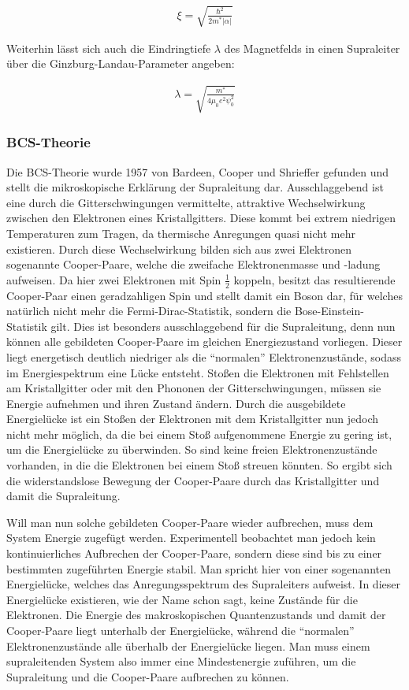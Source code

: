 \begin{align}
\xi= \sqrt{\frac{\hslash^2}{2m^*\vert\alpha\vert}}
\end{align}

Weiterhin lässt sich auch die Eindringtiefe $\lambda$ des Magnetfelds in einen Supraleiter über die Ginzburg-Landau-Parameter angeben:

\begin{align}
\lambda=\sqrt{\frac{m^*}{4\mu_0e^2\psi_0^2}}
\end{align}


\subsubsection{BCS-Theorie}

Die BCS-Theorie wurde 1957 von Bardeen, Cooper und Shrieffer gefunden und stellt die mikroskopische Erklärung der Supraleitung dar. Ausschlaggebend ist eine durch die Gitterschwingungen vermittelte, attraktive Wechselwirkung zwischen den Elektronen eines Kristallgitters. Diese kommt bei extrem niedrigen Temperaturen zum Tragen, da thermische Anregungen quasi nicht mehr existieren. Durch diese Wechselwirkung bilden sich aus zwei Elektronen sogenannte Cooper-Paare, welche die zweifache Elektronenmasse und -ladung aufweisen. Da hier zwei Elektronen mit Spin $\frac{1}{2}$ koppeln, besitzt das resultierende Cooper-Paar einen geradzahligen Spin und stellt damit ein Boson dar, für welches natürlich nicht mehr die Fermi-Dirac-Statistik, sondern die Bose-Einstein-Statistik gilt. Dies ist besonders ausschlaggebend für die Supraleitung, denn nun können alle gebildeten Cooper-Paare im gleichen Energiezustand vorliegen. Dieser liegt energetisch deutlich niedriger als die ``normalen'' Elektronenzustände, sodass im Energiespektrum eine Lücke entsteht. Stoßen die Elektronen mit Fehlstellen am Kristallgitter oder mit den Phononen der Gitterschwingungen, müssen sie Energie aufnehmen und ihren Zustand ändern. Durch die ausgebildete Energielücke ist ein Stoßen der Elektronen mit dem Kristallgitter nun jedoch nicht mehr möglich, da die bei einem Stoß aufgenommene Energie zu gering ist, um die Energielücke zu überwinden. So sind keine freien Elektronenzustände vorhanden, in die die Elektronen bei einem Stoß streuen könnten. So ergibt sich die widerstandslose Bewegung der Cooper-Paare durch das Kristallgitter und damit die Supraleitung. 

Will man nun solche gebildeten Cooper-Paare wieder aufbrechen, muss dem System Energie zugefügt werden. Experimentell beobachtet man jedoch kein kontinuierliches Aufbrechen der Cooper-Paare, sondern diese sind bis zu einer bestimmten zugeführten Energie stabil. Man spricht hier von einer sogenannten Energielücke, welches das Anregungsspektrum des Supraleiters aufweist. In dieser Energielücke existieren, wie der Name schon sagt, keine Zustände für die Elektronen. Die Energie des makroskopischen Quantenzustands und damit der Cooper-Paare liegt unterhalb der Energielücke, während die ``normalen'' Elektronenzustände alle überhalb der Energielücke liegen. Man muss einem supraleitenden System also immer eine Mindestenergie zuführen, um die Supraleitung und die Cooper-Paare aufbrechen zu können.



